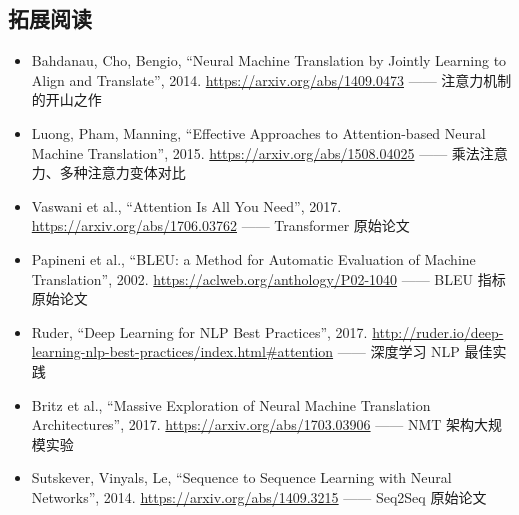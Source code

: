 \documentclass[a4paper]{article}
\begin{document}
\subsection{拓展阅读}

\begin{itemize}
    \item Bahdanau, Cho, Bengio, ``Neural Machine Translation by Jointly Learning to Align and Translate'', 2014. \url{https://arxiv.org/abs/1409.0473} —— 注意力机制的开山之作
    \item Luong, Pham, Manning, ``Effective Approaches to Attention-based Neural Machine Translation'', 2015. \url{https://arxiv.org/abs/1508.04025} —— 乘法注意力、多种注意力变体对比
    \item Vaswani et al., ``Attention Is All You Need'', 2017. \url{https://arxiv.org/abs/1706.03762} —— Transformer 原始论文
    \item Papineni et al., ``BLEU: a Method for Automatic Evaluation of Machine Translation'', 2002. \url{https://aclweb.org/anthology/P02-1040} —— BLEU 指标原始论文
    \item Ruder, ``Deep Learning for NLP Best Practices'', 2017. \url{http://ruder.io/deep-learning-nlp-best-practices/index.html#attention} —— 深度学习 NLP 最佳实践
    \item Britz et al., ``Massive Exploration of Neural Machine Translation Architectures'', 2017. \url{https://arxiv.org/abs/1703.03906} —— NMT 架构大规模实验
    \item Sutskever, Vinyals, Le, ``Sequence to Sequence Learning with Neural Networks'', 2014. \url{https://arxiv.org/abs/1409.3215} —— Seq2Seq 原始论文
\end{itemize}
\end{document}
